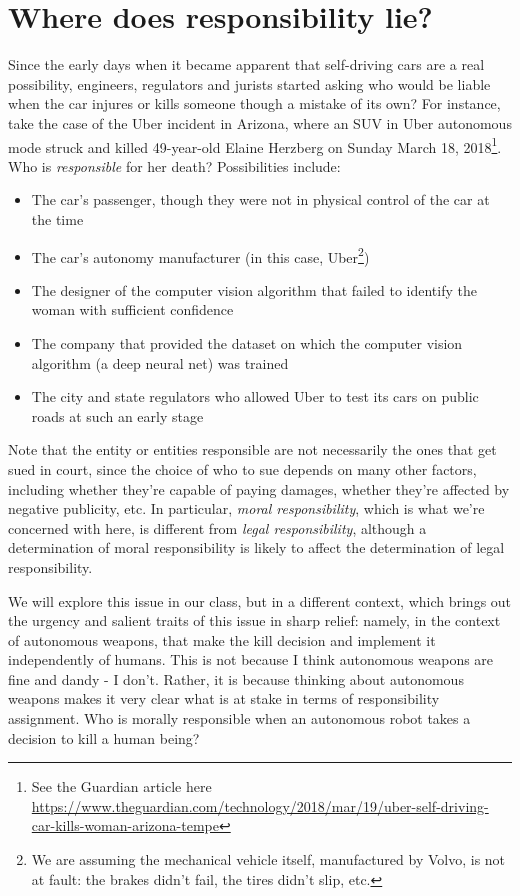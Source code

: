 \documentclass[letta4 paper]{article}
\numberwithin{equation}{section}
\newcommand{\0}{\mathbf{0}}
\begin{document}
	\section{Where does responsibility lie?}
	\label{sec:responsibility}
	Since the early days when it became apparent that self-driving cars are a real possibility, engineers, regulators and jurists started asking who would be liable when the car injures or kills someone though a mistake of its own? 
	For instance, take the case of the Uber incident in Arizona, where an SUV in Uber autonomous mode struck and killed 49-year-old Elaine Herzberg on Sunday March 18, 2018\footnote{See the Guardian article here \url{https://www.theguardian.com/technology/2018/mar/19/uber-self-driving-car-kills-woman-arizona-tempe}}.
	Who is \textit{responsible} for her death? 
	Possibilities include:
	\begin{itemize}
		\item The car's passenger, though they were not in physical control of the car at the time
		\item The car's autonomy manufacturer (in this case, Uber\footnote{We are assuming the mechanical vehicle itself, manufactured by Volvo, is not at fault: the brakes didn't fail, the tires didn't slip, etc.})
		\item The designer of the computer vision algorithm that failed to identify the woman with sufficient confidence
		\item The company that provided the dataset on which the computer vision algorithm (a deep neural net) was trained
		\item The city and state regulators who allowed Uber to test its cars on public roads at such an early stage
	\end{itemize}
	Note that the entity or entities responsible are not necessarily the ones that get sued in court, since the choice of who to sue depends on many other factors, including whether they're capable of paying damages, whether they're affected by negative publicity, etc.
	In particular, \textit{moral responsibility}, which is what we're concerned with here, is different from \textit{legal responsibility}, although a determination of moral responsibility is likely to affect the determination of legal responsibility.
	
	We will explore this issue in our class, but in a different context, which brings out the urgency and salient traits of this issue in sharp relief: namely, in the context of autonomous weapons, that make the kill decision and implement it independently of humans.
	This is not because I think autonomous weapons are fine and dandy - I don't.
	Rather, it is because thinking about autonomous weapons makes it very clear what is at stake in terms of responsibility assignment.
	Who is morally responsible when an autonomous robot takes a decision to kill a human being?
	
\end{document}
